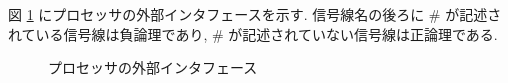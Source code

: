 \documentclass[../specifications.tex]{subfiles}
\begin{document}
  図 \ref{fig:external-interface} にプロセッサの外部インタフェースを示す.
  信号線名の後ろに \# が記述されている信号線は負論理であり, 
  \# が記述されていない信号線は正論理である.

  \begin{figure}[h]
    \centering
    \caption{プロセッサの外部インタフェース}
    \label{fig:external-interface}
  \end{figure}
\end{document}
